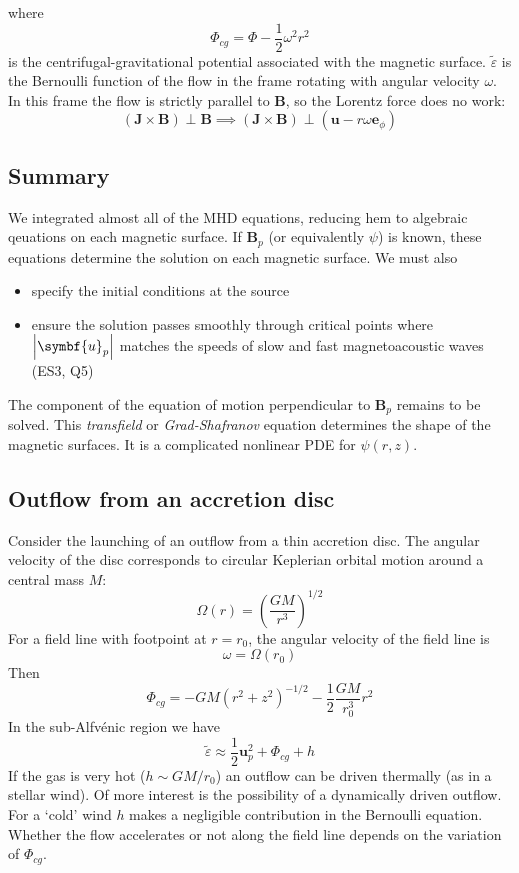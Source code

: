 \documentclass{jknotes}
\newcommand{\B}{\symbf{B}}
\renewcommand{\u}{\symbf{u}}
\newcommand{\veps}{\varepsilon}
\begin{document}
where
\begin{equation}
	\Phi_{cg} = \Phi - \frac{1}{2}\omega^2 r^2
\end{equation}
is the centrifugal-gravitational potential associated with the magnetic
surface. $\tilde{\veps}$ is the Bernoulli function of the flow in the frame
rotating with angular velocity $\omega$. In this frame the flow is strictly
parallel to $\B$, so the Lorentz force does no work:
\begin{equation}
	(\symbf{J}\times\B)\perp\B \implies (\symbf{J}\times\B)\perp(\u-r\omega
	\symbf{e}_\phi)
\end{equation}

\subsection{Summary}
We integrated almost all of the MHD equations, reducing hem to algebraic
qeuations on each magnetic surface. If $\B_p$ (or equivalently $\psi$) is
known, these equations determine the solution on each magnetic surface. We
must also
\begin{itemize}
	\item specify the initial conditions at the source
	\item ensure the solution passes smoothly through critical points where
		$\abs{\u_p}$ matches the speeds of slow and fast magnetoacoustic waves
		(ES3, Q5)
\end{itemize}

The component of the equation of motion perpendicular to $\B_p$ remains to be
solved. This \emph{transfield} or \emph{Grad-Shafranov} equation determines
the shape of the magnetic surfaces. It is a complicated nonlinear PDE for
$\psi(r,z)$.

\subsection{Outflow from an accretion disc}
Consider the launching of an outflow from a thin accretion disc. The angular
velocity of the disc corresponds to circular Keplerian orbital motion around a
central mass $M$:
\begin{equation}
	\Omega(r) = \left(\frac{GM}{r^3}\right)^{1/2}
\end{equation}
For a field line with footpoint at $r=r_0$, the angular velocity of the field
line is
\begin{equation}
	\omega = \Omega(r_0)
\end{equation}
Then
\begin{equation}
	\Phi_{cg} = -GM(r^2+z^2)^{-1/2} - \frac{1}{2}\frac{GM}{r_0^3}r^2
\end{equation}
In the sub-Alfv\'{e}nic region we have
\begin{equation}
\tilde{\veps} \approx \frac{1}{2}\u_p^2 + \Phi_{cg} + h
\end{equation}
If the gas is very hot ($h \sim GM/r_0$) an outflow can be driven thermally
(as in a stellar wind). Of more interest is the possibility of a dynamically
driven outflow. For a `cold' wind $h$ makes a negligible contribution in the
Bernoulli equation. Whether the flow accelerates or not along the field line
depends on the variation of $\Phi_{cg}$. 
\end{document}
